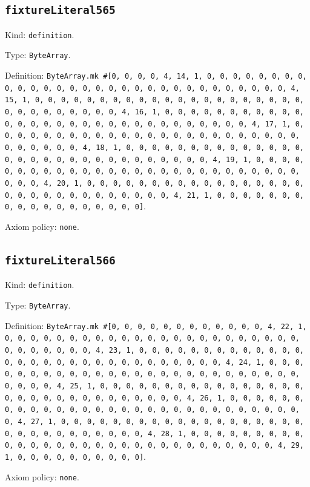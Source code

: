 \documentclass[11pt]{article}
\begin{document}
\subsection*{\texttt{fixtureLiteral565}}
\noindent Kind: \texttt{definition}.\par
\noindent Type: \texttt{ByteArray}.\par
\noindent Definition: \texttt{ByteArray.mk \#[0, 0, 0, 0, 4, 14, 1, 0, 0, 0, 0, 0, 0, 0, 0, 0, 0, 0, 0, 0, 0, 0, 0, 0, 0, 0, 0, 0, 0, 0, 0, 0, 0, 0, 0, 0, 0, 4, 15, 1, 0, 0, 0, 0, 0, 0, 0, 0, 0, 0, 0, 0, 0, 0, 0, 0, 0, 0, 0, 0, 0, 0, 0, 0, 0, 0, 0, 0, 0, 0, 4, 16, 1, 0, 0, 0, 0, 0, 0, 0, 0, 0, 0, 0, 0, 0, 0, 0, 0, 0, 0, 0, 0, 0, 0, 0, 0, 0, 0, 0, 0, 0, 0, 4, 17, 1, 0, 0, 0, 0, 0, 0, 0, 0, 0, 0, 0, 0, 0, 0, 0, 0, 0, 0, 0, 0, 0, 0, 0, 0, 0, 0, 0, 0, 0, 0, 4, 18, 1, 0, 0, 0, 0, 0, 0, 0, 0, 0, 0, 0, 0, 0, 0, 0, 0, 0, 0, 0, 0, 0, 0, 0, 0, 0, 0, 0, 0, 0, 0, 4, 19, 1, 0, 0, 0, 0, 0, 0, 0, 0, 0, 0, 0, 0, 0, 0, 0, 0, 0, 0, 0, 0, 0, 0, 0, 0, 0, 0, 0, 0, 0, 0, 4, 20, 1, 0, 0, 0, 0, 0, 0, 0, 0, 0, 0, 0, 0, 0, 0, 0, 0, 0, 0, 0, 0, 0, 0, 0, 0, 0, 0, 0, 0, 0, 0, 4, 21, 1, 0, 0, 0, 0, 0, 0, 0, 0, 0, 0, 0, 0, 0, 0, 0, 0, 0, 0]}.\par
\noindent Axiom policy: \texttt{none}.\par
\subsection*{\texttt{fixtureLiteral566}}
\noindent Kind: \texttt{definition}.\par
\noindent Type: \texttt{ByteArray}.\par
\noindent Definition: \texttt{ByteArray.mk \#[0, 0, 0, 0, 0, 0, 0, 0, 0, 0, 0, 0, 4, 22, 1, 0, 0, 0, 0, 0, 0, 0, 0, 0, 0, 0, 0, 0, 0, 0, 0, 0, 0, 0, 0, 0, 0, 0, 0, 0, 0, 0, 0, 0, 0, 4, 23, 1, 0, 0, 0, 0, 0, 0, 0, 0, 0, 0, 0, 0, 0, 0, 0, 0, 0, 0, 0, 0, 0, 0, 0, 0, 0, 0, 0, 0, 0, 0, 4, 24, 1, 0, 0, 0, 0, 0, 0, 0, 0, 0, 0, 0, 0, 0, 0, 0, 0, 0, 0, 0, 0, 0, 0, 0, 0, 0, 0, 0, 0, 0, 0, 4, 25, 1, 0, 0, 0, 0, 0, 0, 0, 0, 0, 0, 0, 0, 0, 0, 0, 0, 0, 0, 0, 0, 0, 0, 0, 0, 0, 0, 0, 0, 0, 0, 4, 26, 1, 0, 0, 0, 0, 0, 0, 0, 0, 0, 0, 0, 0, 0, 0, 0, 0, 0, 0, 0, 0, 0, 0, 0, 0, 0, 0, 0, 0, 0, 0, 4, 27, 1, 0, 0, 0, 0, 0, 0, 0, 0, 0, 0, 0, 0, 0, 0, 0, 0, 0, 0, 0, 0, 0, 0, 0, 0, 0, 0, 0, 0, 0, 0, 4, 28, 1, 0, 0, 0, 0, 0, 0, 0, 0, 0, 0, 0, 0, 0, 0, 0, 0, 0, 0, 0, 0, 0, 0, 0, 0, 0, 0, 0, 0, 0, 0, 4, 29, 1, 0, 0, 0, 0, 0, 0, 0, 0, 0, 0]}.\par
\noindent Axiom policy: \texttt{none}.\par
\end{document}
